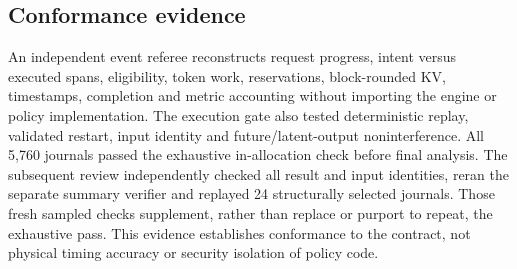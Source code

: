 \subsection{Conformance evidence}
An independent event referee reconstructs request progress, intent versus
executed spans, eligibility, token work, reservations, block-rounded KV,
timestamps, completion and metric accounting without importing the engine
or policy implementation. The execution gate also tested deterministic
replay, validated restart, input identity and future/latent-output
noninterference. All 5,760 journals passed the exhaustive in-allocation
check before final analysis. The subsequent review independently checked
all result and input identities, reran the separate summary verifier and
replayed 24 structurally selected journals. Those fresh sampled checks
supplement, rather than replace or purport to repeat, the exhaustive pass.
This evidence establishes conformance to the contract, not physical timing
accuracy or security isolation of policy code.
